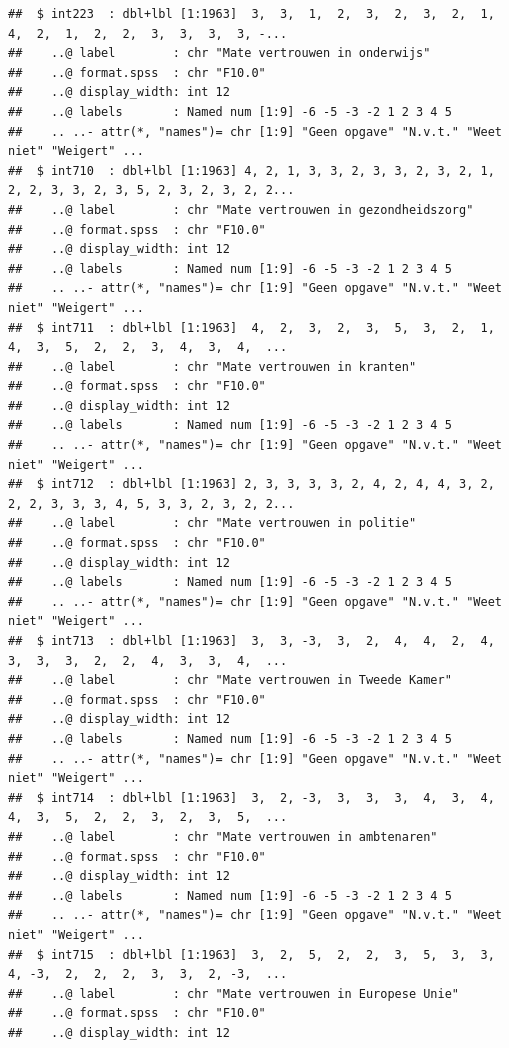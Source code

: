 \documentclass[
]{book}
\begin{document}
\begin{verbatim}
##  $ int223  : dbl+lbl [1:1963]  3,  3,  1,  2,  3,  2,  3,  2,  1,  4,  2,  1,  2,  2,  3,  3,  3,  3, -...
##    ..@ label        : chr "Mate vertrouwen in onderwijs"
##    ..@ format.spss  : chr "F10.0"
##    ..@ display_width: int 12
##    ..@ labels       : Named num [1:9] -6 -5 -3 -2 1 2 3 4 5
##    .. ..- attr(*, "names")= chr [1:9] "Geen opgave" "N.v.t." "Weet niet" "Weigert" ...
##  $ int710  : dbl+lbl [1:1963] 4, 2, 1, 3, 3, 2, 3, 3, 2, 3, 2, 1, 2, 2, 3, 3, 2, 3, 5, 2, 3, 2, 3, 2, 2...
##    ..@ label        : chr "Mate vertrouwen in gezondheidszorg"
##    ..@ format.spss  : chr "F10.0"
##    ..@ display_width: int 12
##    ..@ labels       : Named num [1:9] -6 -5 -3 -2 1 2 3 4 5
##    .. ..- attr(*, "names")= chr [1:9] "Geen opgave" "N.v.t." "Weet niet" "Weigert" ...
##  $ int711  : dbl+lbl [1:1963]  4,  2,  3,  2,  3,  5,  3,  2,  1,  4,  3,  5,  2,  2,  3,  4,  3,  4,  ...
##    ..@ label        : chr "Mate vertrouwen in kranten"
##    ..@ format.spss  : chr "F10.0"
##    ..@ display_width: int 12
##    ..@ labels       : Named num [1:9] -6 -5 -3 -2 1 2 3 4 5
##    .. ..- attr(*, "names")= chr [1:9] "Geen opgave" "N.v.t." "Weet niet" "Weigert" ...
##  $ int712  : dbl+lbl [1:1963] 2, 3, 3, 3, 3, 2, 4, 2, 4, 4, 3, 2, 2, 2, 3, 3, 3, 4, 5, 3, 3, 2, 3, 2, 2...
##    ..@ label        : chr "Mate vertrouwen in politie"
##    ..@ format.spss  : chr "F10.0"
##    ..@ display_width: int 12
##    ..@ labels       : Named num [1:9] -6 -5 -3 -2 1 2 3 4 5
##    .. ..- attr(*, "names")= chr [1:9] "Geen opgave" "N.v.t." "Weet niet" "Weigert" ...
##  $ int713  : dbl+lbl [1:1963]  3,  3, -3,  3,  2,  4,  4,  2,  4,  3,  3,  3,  2,  2,  4,  3,  3,  4,  ...
##    ..@ label        : chr "Mate vertrouwen in Tweede Kamer"
##    ..@ format.spss  : chr "F10.0"
##    ..@ display_width: int 12
##    ..@ labels       : Named num [1:9] -6 -5 -3 -2 1 2 3 4 5
##    .. ..- attr(*, "names")= chr [1:9] "Geen opgave" "N.v.t." "Weet niet" "Weigert" ...
##  $ int714  : dbl+lbl [1:1963]  3,  2, -3,  3,  3,  3,  4,  3,  4,  4,  3,  5,  2,  2,  3,  2,  3,  5,  ...
##    ..@ label        : chr "Mate vertrouwen in ambtenaren"
##    ..@ format.spss  : chr "F10.0"
##    ..@ display_width: int 12
##    ..@ labels       : Named num [1:9] -6 -5 -3 -2 1 2 3 4 5
##    .. ..- attr(*, "names")= chr [1:9] "Geen opgave" "N.v.t." "Weet niet" "Weigert" ...
##  $ int715  : dbl+lbl [1:1963]  3,  2,  5,  2,  2,  3,  5,  3,  3,  4, -3,  2,  2,  2,  3,  3,  2, -3,  ...
##    ..@ label        : chr "Mate vertrouwen in Europese Unie"
##    ..@ format.spss  : chr "F10.0"
##    ..@ display_width: int 12

\end{verbatim}
\end{document}
